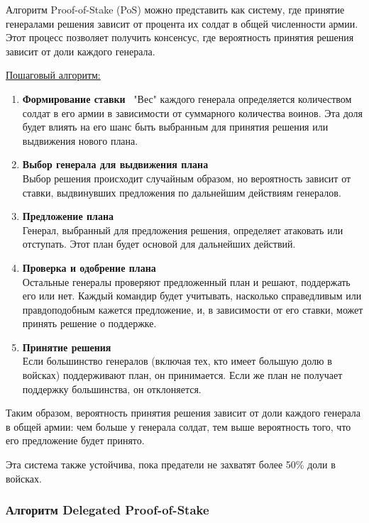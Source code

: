 \hspace{1.25cm}
Алгоритм Proof-of-Stake (PoS) можно представить как систему, где принятие генералами решения зависит от процента их солдат в общей численности армии. Этот процесс позволяет получить консенсус, где вероятность принятия решения зависит от доли каждого генерала.

\underline{Пошаговый алгоритм:}

\begin{enumerate}
	\item \textbf{Формирование ставки} \ "Вес" каждого генерала определяется количеством солдат в его армии в зависимости от суммарного количества воинов. Эта доля будет влиять на его шанс быть выбранным для принятия решения или выдвижения нового плана.

	\item \textbf{Выбор генерала для выдвижения плана}\\
Выбор решения происходит случайным образом, но вероятность зависит от ставки, выдвинувших предложения по дальнейшим действиям генералов.

	\item \textbf{Предложение плана} \\
Генерал, выбранный для предложения решения, определяет атаковать или отступать. Этот план будет основой для дальнейших действий.

	\item \textbf{Проверка и одобрение плана} \\
Остальные генералы проверяют предложенный план и решают, поддержать его или нет. Каждый командир будет учитывать, насколько справедливым или правдоподобным кажется предложение, и, в зависимости от его ставки, может принять решение о поддержке.

	\item \textbf{Принятие решения} \\
Если большинство генералов (включая тех, кто имеет большую долю в войсках) поддерживают план, он принимается. Если же план не получает поддержку большинства, он отклоняется.
\end{enumerate}

Таким образом, вероятность принятия решения зависит от доли каждого генерала в общей армии: чем больше у генерала солдат, тем выше вероятность того, что его предложение будет принято.

Эта система также устойчива, пока предатели не захватят более 50\% доли в войсках.~\cite{forklog_PoS}


\subsubsection{Алгоритм Delegated Proof-of-Stake}


